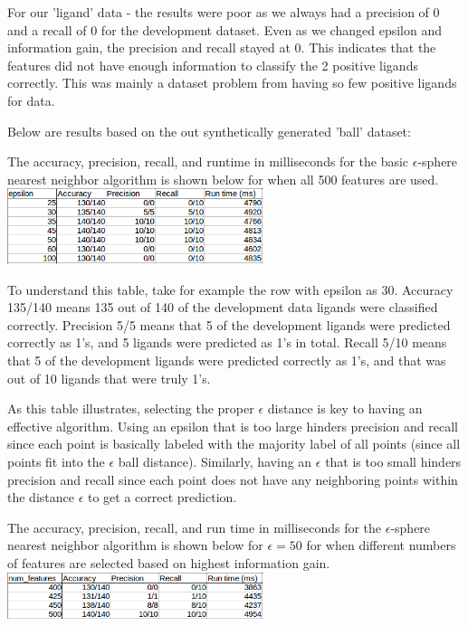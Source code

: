 \documentclass[11pt,letterpaper]{article}
\begin{document}
For our 'ligand' data - the results were poor as we always had a precision of 0 and a recall of 0 for the development dataset.  Even as we changed epsilon and information gain, the precision and recall stayed at 0.  This indicates that the features did not have enough information to classify the 2 positive ligands correctly.  This was mainly a dataset problem from having so few positive ligands for data.

Below are results based on the out synthetically generated 'ball' dataset:

The accuracy, precision, recall, and runtime in milliseconds for the basic $\epsilon$-sphere nearest neighbor algorithm is shown below for when all 500 features are used. \\

\includegraphics[width=75mm]{epsNNAllFeaturesData.png}

To understand this table, take for example the row with epsilon as 30. 
Accuracy 135/140 means 135 out of 140 of the development data ligands were classified correctly.  Precision 5/5 means that 5 of the development ligands were predicted correctly as 1's, and 5 ligands were predicted as 1's in total.  Recall 5/10 means that 5 of the development ligands were predicted correctly as 1's, and that was out of 10 ligands that were truly 1's.

As this table illustrates, selecting the proper $\epsilon$ distance is key to having an effective algorithm.  Using an epsilon that is too large hinders precision and recall since each point is basically labeled with the majority label of all points (since all points fit into the $\epsilon$ ball distance).  Similarly, having an $\epsilon$ that is too small hinders precision and recall since each point does not have any neighboring points within the distance $\epsilon$ to get a correct prediction.

The accuracy, precision, recall, and run time in milliseconds for the $\epsilon$-sphere nearest neighbor algorithm is shown below for $\epsilon=50$ for when different numbers of features are selected based on highest information gain. \\

\includegraphics[width=75mm]{epsNNVaryFeaturesData.png}
\end{document}

